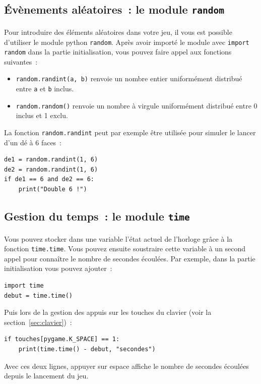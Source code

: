 \subsection{Évènements aléatoires~: le module \texttt{random}}
\label{sec:random}

\paragraph{}
Pour introduire des éléments aléatoires dans votre jeu, il vous est possible d'utiliser le module python \texttt{random}.
Après avoir importé le module avec \texttt{import random} dans la partie initialisation, vous pouvez faire appel aux fonctions suivantes~:
\begin{itemize}
	\item \texttt{random.randint(a, b)} renvoie un nombre entier uniformément distribué entre \texttt{a} et \texttt{b} inclus.
	\item \texttt{random.random()} renvoie un nombre à virgule uniformément distribué entre 0 inclus et 1 exclu.
\end{itemize}

La fonction \texttt{random.randint} peut par exemple être utilisée pour simuler le lancer d'un dé à 6 faces~:
\begin{verbatim}
de1 = random.randint(1, 6)
de2 = random.randint(1, 6)
if de1 == 6 and de2 == 6:
    print("Double 6 !")
\end{verbatim}

\subsection{Gestion du temps~: le module \texttt{time}}
\label{sec:time}

\paragraph{}
Vous pouvez stocker dans une variable l'état actuel de l'horloge grâce à la fonction \texttt{time.time}.
Vous pouvez ensuite soustraire cette variable à un second appel pour connaître le nombre de secondes écoulées.
Par exemple, dans la partie initialisation vous pouvez ajouter~:
\begin{verbatim}
import time
debut = time.time()
\end{verbatim}
Puis lors de la gestion des appuis sur les touches du clavier (voir la section~\ref{sec:clavier})~:
\begin{verbatim}
if touches[pygame.K_SPACE] == 1:
    print(time.time() - debut, "secondes")
\end{verbatim}
Avec ces deux lignes, appuyer sur espace affiche le nombre de secondes écoulées depuis le lancement du jeu.

